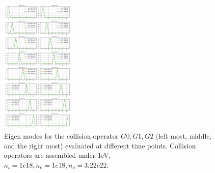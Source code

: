 \documentclass{article}
\begin{document}
\begin{figure}[!htbp]
	\includegraphics[width=0.32\textwidth]{fig/g2_Nr_7_eig_ev_1.00E+00_NI_1.00E+18_N0_3.22E+22_NE_1.00E+18.png}
	\caption{Eigen modes for the collision operator $G0,G1,G2$ (left most, middle, and the right most) evaluated at different time points. Collision operators are assembled under 1eV, $n_i=1e18,n_e=1e18, n_o = 3.22e22$.\label{fig:eig_g_sep}}
\end{figure}
\end{document}
